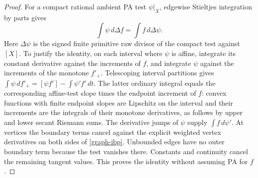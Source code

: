 \begin{proof}
For a compact rational ambient PA test $\psi|_X$, edgewise Stieltjes
integration by parts gives
\begin{equation}\label{graph-ibp}
 \int\psi\,d\Delta f=\int f\,d\Delta\psi.
\end{equation}
Here $\Delta\psi$ is the signed finite primitive raw divisor of the
compact test against $[X]$. To justify the identity, on each interval
where $\psi$ is affine, integrate its constant derivative against the
increments of $f$, and integrate $\psi$ against the increments of the
monotone $f'_+$. Telescoping interval partitions gives
$\int\psi\,d f'_+=[\psi f']-\int\psi'f'\,dt$.
The latter ordinary integral equals the corresponding affine-test slope
times the endpoint increment of $f$: convex functions with finite
endpoint slopes are Lipschitz on the interval and their increments are
the integrals of their monotone derivatives, as follows by upper and
lower secant Riemann sums. The derivative jumps of $\psi$ supply
$\int f\,d\psi'$. At vertices the boundary terms cancel against the
explicit weighted vertex derivatives on both sides of
\eqref{graph-ibp}. Unbounded edges have no outer boundary term because
the test vanishes there. Constants and continuity cancel the remaining
tangent values. This proves the identity without assuming PA for $f$.


\end{proof}
